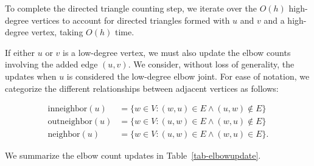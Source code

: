 \documentclass[11pt]{article}
\begin{document}
To complete the directed triangle counting step, we iterate over the 
$O(h)$ high-degree vertices to account for directed triangles formed with $u$ 
and $v$ and a high-degree vertex, taking $O(h)$ time.

If either $u$ or $v$ is a low-degree vertex, we must also update the elbow 
counts involving the added edge $(u,v)$. We consider, without loss of generality,
the updates when $u$ is considered the low-degree elbow joint. For ease of notation,
we categorize the different relationships between adjacent vertices as follows:

\vspace*{-6pt}
{\small
\begin{align*}
\mathrm{inneighbor}(u) &= \{w\in V: (w,u)\in E \wedge (u,w) \not\in E\} \\
\mathrm{outneighbor}(u) &= \{w\in V: (u,w)\in E \wedge (w,u) \not\in E\} \\
\mathrm{neighbor}(u) &= \{w\in V: (u,w)\in E \wedge (w,u) \in E\}.
\end{align*} 
}

\vspace*{-6pt}
We summarize the elbow count updates in Table~\ref{tab-elbowupdate}.
\end{document}
